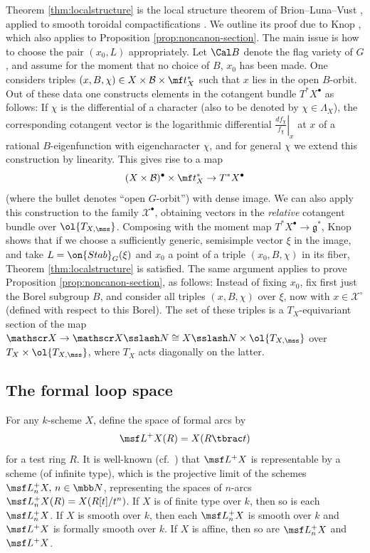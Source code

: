 Theorem \ref{thm:localstructure} is the local structure theorem of Brion--Luna--Vust \cite[Th\'eor\`eme 3.5]{BLV}, applied to smooth toroidal compactifications \cite{KnLV}. We outline its proof due to Knop \cite[Theorem 2.3]{KnMotion}, which also applies to Proposition \ref{prop:noncanon-section}. The main issue is how to choose the pair $(x_0,L)$ appropriately.
Let $\Cal B$ denote the flag variety of $G$, and assume for the moment that no choice of $B$, $x_0$ has been made.
One considers triples $(x,B,\chi) \in X\times\mathcal B\times \mf t_X^*$ such that
$x$ lies in the open $B$-orbit. Out of these data one constructs elements in the cotangent bundle $T^*X^\bullet$ as follows: If $\chi$ is the differential of a character (also to be denoted by $\chi\in \Lambda_X$), the corresponding cotangent vector is the logarithmic differential $\left.\frac{d f_\chi}{f_\chi}\right|_x$ at $x$ of a rational $B$-eigenfunction with eigencharacter $\chi$, and for general $\chi$ we extend this construction by linearity. This gives rise to a map
\[ (X\times\mathcal B)^\bullet \times \mf t_X^* \to T^*X^\bullet \]
(where the bullet denotes ``open $G$-orbit'') with dense image. We can also apply this construction to the family $\mathscr X^\bullet$, obtaining vectors in the \emph{relative} cotangent bundle over $\ol{T_{X,\mss}}$. Composing with the moment map $T^*X^\bullet \to \mathfrak g^*$, Knop shows that if we choose a sufficiently generic, semisimple vector $\xi$ in the image, and take $L=\on{Stab}_G(\xi)$ and $x_0$ a point of a triple $(x_0, B, \chi)$ in its fiber, Theorem \ref{thm:localstructure} is satisfied. The same argument applies to prove Proposition \ref{prop:noncanon-section}, as follows: Instead of fixing $x_0$, fix first just the Borel subgroup $B$, and consider all triples $(x,B,\chi)$ over $\xi$, now with $x \in \mathscr X^\circ$ (defined with respect to this Borel). The set of these triples is a
$T_X$-equivariant section of the map
$\mathscr X \to \mathscr X\sslash N \cong X\sslash N \times \ol{T_{X,\mss}}$
over $T_X\times \ol{T_{X,\mss}}$, where $T_X$ acts diagonally on the latter.



\subsection{The formal loop space}
\label{sect:formalloop}
For any $k$-scheme $X$, define the space of formal arcs by
\[ \msf L^+ X(R) = X(R\tbrac t) \]
for a test ring $R$.
It is well-known (cf.~\cite[Proposition 1.2.1]{KV}) that $\msf L^+ X$ is representable by a scheme (of infinite type), which is
the projective limit of the schemes $\msf L^+_n X,\, n \in \mbb N$,
representing the spaces of $n$-arcs
$\msf L^+_n X(R) = X(R[t]/t^n)$.
If $X$ is of finite type over $k$, then so is each $\msf L^+_n X$. If $X$ is smooth over $k$, then each $\msf L^+_n X$ is smooth over $k$
and $\msf L^+ X$ is formally smooth over $k$. If $X$ is affine, then so are
$\msf L^+_n X$ and $\msf L^+ X$.

